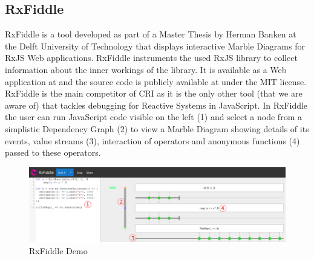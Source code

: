 	\subsection{RxFiddle}
	\label{sec:RxFiddle} %
	RxFiddle \cite{RxFiddle} is a tool developed as part of a Master Thesis by Herman Banken at the Delft University of Technology that displays interactive Marble Diagrams for RxJS Web applications. RxFiddle instruments the used RxJS library to collect information about the inner workings of the library. It is available as a Web application at \cite{RxFiddle} and the source code is publicly available at \cite{RxFiddleGitHub} under the MIT license. RxFiddle is the main competitor of CRI as it is the only other tool (that we are aware of) that tackles debugging for Reactive Systems in JavaScript. In RxFiddle the user can run JavaScript code visible on the left (1) and select a node from a simplistic Dependency Graph (2) to view a Marble Diagram showing details of its events, value streams (3), interaction of operators and anonymous functions (4) passed to these operators.
	
	\begin{figure}[!h]
		\centering
		\includegraphics[scale=0.5,trim=0 0 0 0]{gfx/RxFiddleDemo.png}
		\caption{RxFiddle Demo \protect\cite{RxFiddle}}
		\label{fig:RxFiddleDemo}
	\end{figure}

